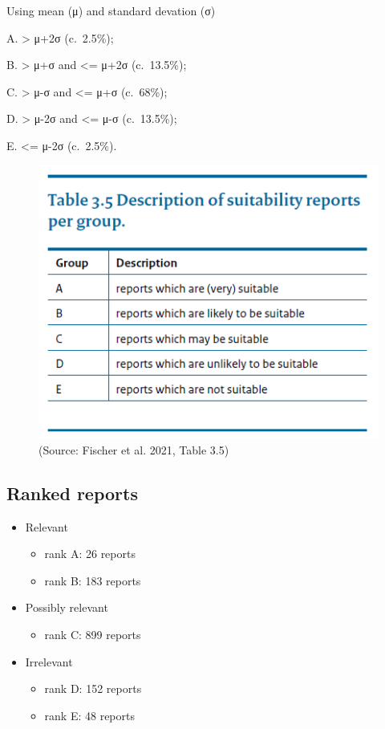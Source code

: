 \documentclass[
  letterpaper,
  DIV=11,
  numbers=noendperiod]{scrartcl}
\providecommand{\tightlist}{%
  \setlength{\itemsep}{0pt}\setlength{\parskip}{0pt}}\usepackage{longtable,booktabs,array}
\begin{document}
Using mean (μ) and standard devation (σ)

A. \textgreater{} μ+2σ (c.~2.5\%);

B. \textgreater{} μ+σ and \textless= μ+2σ (c.~13.5\%);

C. \textgreater{} μ-σ and \textless= μ+σ (c.~68\%);

D. \textgreater{} μ-2σ and \textless= μ-σ (c.~13.5\%);

E. \textless= μ-2σ (c.~2.5\%).

\begin{figure}

{\centering \includegraphics{images/Table_3.5.png}

}

\caption{(Source: Fischer et al. 2021, Table 3.5)}

\end{figure}

\hypertarget{ranked-reports}{%
\subsection{Ranked reports}\label{ranked-reports}}

\begin{itemize}
\tightlist
\item
  Relevant

  \begin{itemize}
  \tightlist
  \item
    rank A: 26 reports
  \item
    rank B: 183 reports
  \end{itemize}
\item
  Possibly relevant

  \begin{itemize}
  \tightlist
  \item
    rank C: 899 reports
  \end{itemize}
\item
  Irrelevant

  \begin{itemize}
  \tightlist
  \item
    rank D: 152 reports
  \item
    rank E: 48 reports
  \end{itemize}
\end{itemize}
\end{document}
